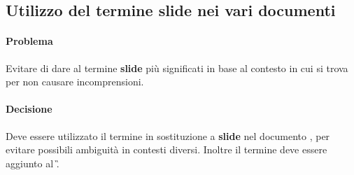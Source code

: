 \subsection{Utilizzo del termine slide nei vari documenti}
\paragraph{Problema} Evitare di dare al termine \textbf{slide} più significati in base al contesto in cui si trova per non causare incomprensioni.
\paragraph{Decisione} Deve essere utilizzato il termine \textbf{} in sostituzione a \textbf{slide} nel documento \AR, per evitare possibili ambiguità in contesti diversi.
Inoltre il termine \textbf{} deve essere aggiunto al \G.
